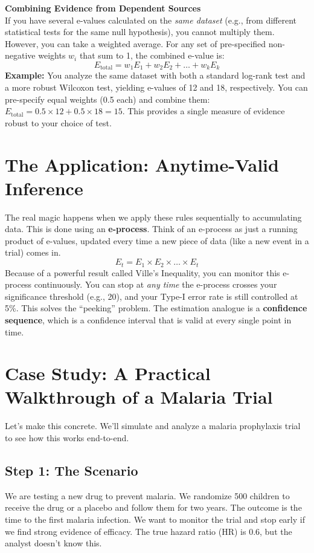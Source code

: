 \documentclass[11pt]{article}
\begin{document}
\begin{notebox}
\textbf{Combining Evidence from Dependent Sources}\\
If you have several e-values calculated on the \textit{same dataset} (e.g., from different statistical tests for the same null hypothesis), you cannot multiply them. However, you can take a weighted average. For any set of pre-specified non-negative weights $w_i$ that sum to 1, the combined e-value is:
$$ E_{\text{total}} = w_1E_1 + w_2E_2 + \dots + w_kE_k $$
\textbf{Example:} You analyze the same dataset with both a standard log-rank test and a more robust Wilcoxon test, yielding e-values of 12 and 18, respectively. You can pre-specify equal weights (0.5 each) and combine them: $E_{\text{total}} = 0.5 \times 12 + 0.5 \times 18 = 15$. This provides a single measure of evidence robust to your choice of test.
\end{notebox}

\section*{The Application: Anytime-Valid Inference}
The real magic happens when we apply these rules sequentially to accumulating data. This is done using an \textbf{e-process}. Think of an e-process as just a running product of e-values, updated every time a new piece of data (like a new event in a trial) comes in.
$$ E_t = E_1 \times E_2 \times \dots \times E_t $$
Because of a powerful result called Ville's Inequality, you can monitor this e-process continuously. You can stop at \textit{any time} the e-process crosses your significance threshold (e.g., 20), and your Type-I error rate is still controlled at 5\%. This solves the ``peeking'' problem. The estimation analogue is a \textbf{confidence sequence}, which is a confidence interval that is valid at every single point in time.

\section*{Case Study: A Practical Walkthrough of a Malaria Trial}
Let's make this concrete. We'll simulate and analyze a malaria prophylaxis trial to see how this works end-to-end.

\subsection*{Step 1: The Scenario}
We are testing a new drug to prevent malaria. We randomize 500 children to receive the drug or a placebo and follow them for two years. The outcome is the time to the first malaria infection. We want to monitor the trial and stop early if we find strong evidence of efficacy. The true hazard ratio (HR) is 0.6, but the analyst doesn't know this.
\end{document}
